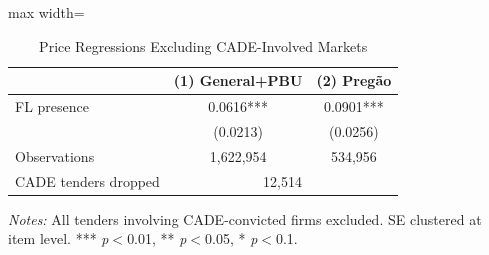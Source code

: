 \begin{table}[htbp]
\centering
\caption{Price Regressions Excluding CADE-Involved Markets}
\label{tab:excl_cade}
\begin{adjustbox}{max width=\textwidth}
\begin{threeparttable}
\small
\begin{tabular}{lcc}
\toprule
 & (1) General+PBU & (2) Preg\~{a}o \\
\midrule
FL presence & 0.0616*** & 0.0901*** \\
 & (0.0213) & (0.0256) \\
\midrule
Observations & 1,622,954 & 534,956 \\
CADE tenders dropped & \multicolumn{2}{c}{12,514} \\
\bottomrule
\end{tabular}
\begin{tablenotes}
\small
\item \textit{Notes:} All tenders involving CADE-convicted firms excluded. SE clustered at item level. *** \textit{p}$<$0.01, ** \textit{p}$<$0.05, * \textit{p}$<$0.1.
\end{tablenotes}
\end{threeparttable}
\end{adjustbox}
\end{table}
